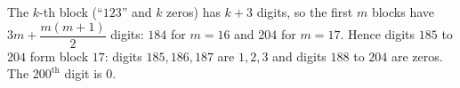 The $k$-th block (``$123$'' and $k$ zeros) has $k+3$ digits, so the first $m$ blocks have $3m+\dfrac{m(m+1)}2$ digits: $184$ for $m=16$ and $204$ for $m=17$. Hence digits $185$ to $204$ form block $17$: digits $185,186,187$ are $1,2,3$ and digits $188$ to $204$ are zeros. The $200^{\text{th}}$ digit is $\boxed{0}$.
